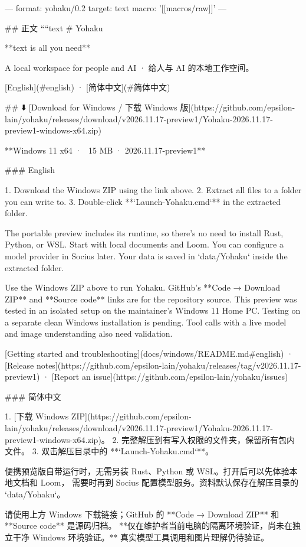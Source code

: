 ---
format: yohaku/0.2
target: text
macro: '[[macros/raw]]'
---

## 正文
````text
# Yohaku

**text is all you need**

A local workspace for people and AI · 给人与 AI 的本地工作空间。

[English](#english) · [简体中文](#简体中文)

## ⬇️ [Download for Windows / 下载 Windows 版](https://github.com/epsilon-lain/yohaku/releases/download/v2026.11.17-preview1/Yohaku-2026.11.17-preview1-windows-x64.zip)

**Windows 11 x64 · ~15 MB · 2026.11.17-preview1**

### English

1. Download the Windows ZIP using the link above.
2. Extract all files to a folder you can write to.
3. Double-click **`Launch-Yohaku.cmd`** in the extracted folder.

The portable preview includes its runtime, so there’s no need to install Rust, Python, or WSL.
Start with local documents and Loom. You can configure a model provider in Socius later.
Your data is saved in `data/Yohaku` inside the extracted folder.

Use the Windows ZIP above to run Yohaku. GitHub’s **Code → Download ZIP** and **Source code** links are for the repository source.
This preview was tested in an isolated setup on the maintainer’s Windows 11 Home PC.
Testing on a separate clean Windows installation is pending. Tool calls with a live model and image understanding also need validation.

[Getting started and troubleshooting](docs/windows/README.md#english) · [Release notes](https://github.com/epsilon-lain/yohaku/releases/tag/v2026.11.17-preview1) · [Report an issue](https://github.com/epsilon-lain/yohaku/issues)

### 简体中文

1. [下载 Windows ZIP](https://github.com/epsilon-lain/yohaku/releases/download/v2026.11.17-preview1/Yohaku-2026.11.17-preview1-windows-x64.zip)。
2. 完整解压到有写入权限的文件夹，保留所有包内文件。
3. 双击解压目录中的 **`Launch-Yohaku.cmd`**。

便携预览版自带运行时，无需另装 Rust、Python 或 WSL。打开后可以先体验本地文档和 Loom，
需要时再到 Socius 配置模型服务。资料默认保存在解压目录的 `data/Yohaku`。

请使用上方 Windows 下载链接；GitHub 的 **Code → Download ZIP** 和 **Source code** 是源码归档。
**仅在维护者当前电脑的隔离环境验证，尚未在独立干净 Windows 环境验证。** 真实模型工具调用和图片理解仍待验证。

